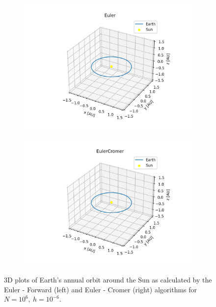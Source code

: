 	\newpage
	\begin{figure}[h!]
		\centering
		\begin{subfigure}{0.49\linewidth}
			\includegraphics[width=1.15\linewidth]{Figure/euler_forward_oneyear.png}
		\end{subfigure}
		\begin{subfigure}{0.49\linewidth}
			\includegraphics[width=1.2\linewidth]{Figure/euler_cromer_oneyear.png}
		\end{subfigure}
	\caption{3D plots of Earth's annual orbit around the Sun as calculated by the Euler - Forward (left) and Euler - Cromer (right) algorithms for $N = 10^6,\ h = 10^{-6}$. }
	\label{eulers3doneyear}
	\end{figure}
